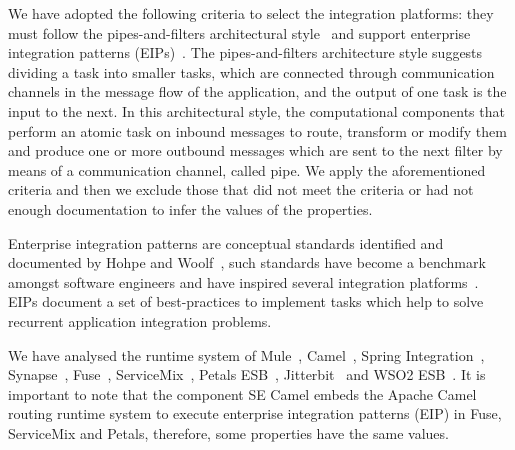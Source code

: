 We have adopted the following criteria to select the integration platforms: they must follow the pipes-and-filters architectural style~\cite{alexander1977} and support enterprise integration patterns (EIPs)~\cite{hohpe2004}.
The pipes-and-filters architecture style suggests dividing a task into smaller tasks, which are connected through communication channels in the message flow of the application, and the output of one task is the input to the next. In this architectural style, the computational components that perform an atomic task on inbound messages to route, transform or modify them and produce one or more outbound messages which are sent to the next filter by means of a communication channel, called pipe. We apply the aforementioned criteria and then we exclude those that did not meet the criteria or had not enough documentation to infer the values of the properties.

Enterprise integration patterns are conceptual standards identified and documented by Hohpe and Woolf~\cite{hohpe2004}, such standards have become a benchmark amongst software engineers and have inspired several integration platforms~\cite{isen2010,dossot2014,fisher2012,frantz2012}. EIPs document a set of best-practices to implement tasks which help to solve recurrent application integration problems.

We have analysed the runtime system of Mule~\cite{dossot2014}, Camel~\cite{isen2010}, Spring Integration~\cite{fisher2012}, Synapse~\cite{rademakers2008,jayasinghe2011}, Fuse~\cite{russell2012}, ServiceMix~\cite{konsek2013}, Petals ESB~\cite{surhone2010}, Jitterbit~\cite{russell2012_1} and WSO2 ESB~\cite{indrasiri2016}. It is important to note that the component SE Camel embeds the Apache Camel routing runtime system to execute enterprise integration patterns (EIP) in Fuse, ServiceMix and Petals, therefore, some properties have the same values.


